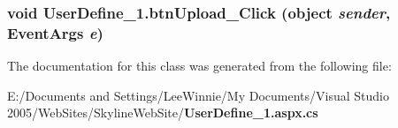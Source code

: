 \subsubsection{\setlength{\rightskip}{0pt plus 5cm}void User\-Define\_\-1.btn\-Upload\_\-Click (object {\em sender}, Event\-Args {\em e})\hspace{0.3cm}{\tt  [protected]}}\label{class_user_define__1_c82fa9d5d28482d89a987b89a029412f}




The documentation for this class was generated from the following file:\begin{CompactItemize}
\item 
E:/Documents and Settings/Lee\-Winnie/My Documents/Visual Studio 2005/Web\-Sites/Skyline\-Web\-Site/{\bf User\-Define\_\-1.aspx.cs}\end{CompactItemize}
